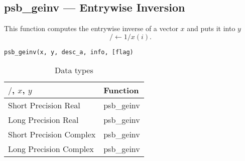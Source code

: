 \clearpage\subsection{psb\_geinv --- Entrywise Inversion}

This function computes the entrywise inverse of a vector $x$ and puts it into
$y$
\[/ \leftarrow 1/x(i).\]

\begin{verbatim}
psb_geinv(x, y, desc_a, info, [flag)
\end{verbatim}
\begin{table}[h]
	\begin{center}
		\begin{tabular}{ll}
			\hline
			$/$, $x$, $y$ & {\bf Function}\\
			\hline
			Short Precision Real & psb\_geinv \\
			Long Precision Real & psb\_geinv \\
			Short Precision Complex & psb\_geinv \\	
			Long Precision Complex & psb\_geinv \\	
			\hline
		\end{tabular}
	\end{center}
	\caption{Data types\label{tab:f90inv}}
\end{table}

